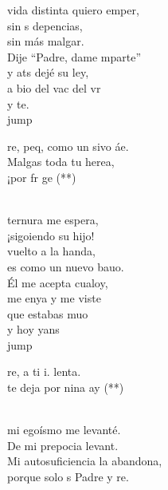 \begin{cancion}%
	 vida distinta quiero emper,\\
	sin s depencias,\\
	sin más malgar.\\
	Dije “Padre, dame mparte” \\
	y ats dejé su ley, \\
	a bio del vac del vr \\
	y  te.\\jump\\
	\begin{chorus}%
	re, peq, como un sivo áe. \\
	Malgas toda tu herea,\\
	¡por fr ge (**) \\
	\end{chorus}%
	\jump\\
	 ternura me espera, \\
	¡sigoiendo su hijo!\\
	vuelto a la handa,\\
	es como un nuevo bauo.\\
	Él me acepta cualoy,\\
	me enya y me viste\\
	que estabas muo \\
	y hoy yans\\jump\\
	\begin{chorus}%
	re, a ti i.  lenta. \\
	te deja por nina ay (**)\\
	\end{chorus}%
	\jump\\
	mi egoísmo me levanté.\\
	De mi prepocia levant. \\
	Mi autosuficiencia la abandona,  \\
	porque solo s Padre y re. \\
\end{cancion}%
